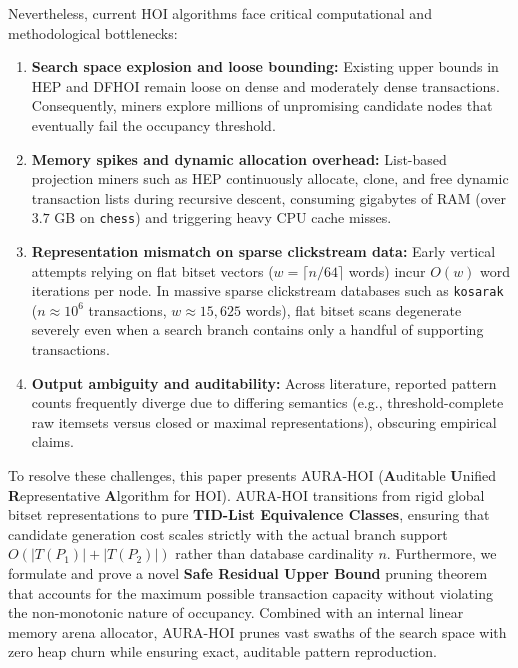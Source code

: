 \documentclass[runningheads,orivec]{llncs}
\newcommand{\AURA}{\textsc{AURA-HOI}}
\newcommand{\HEP}{\textsc{HEP}}
\newcommand{\DFHOI}{\textsc{DFHOI}}
\begin{document}
Nevertheless, current HOI algorithms face critical computational and methodological bottlenecks:
\begin{enumerate}
    \item \textbf{Search space explosion and loose bounding:} Existing upper bounds in \HEP{} and \DFHOI{} remain loose on dense and moderately dense transactions. Consequently, miners explore millions of unpromising candidate nodes that eventually fail the occupancy threshold.
    \item \textbf{Memory spikes and dynamic allocation overhead:} List-based projection miners such as \HEP{} continuously allocate, clone, and free dynamic transaction lists during recursive descent, consuming gigabytes of RAM (over $3.7$ GB on \texttt{chess}) and triggering heavy CPU cache misses.
    \item \textbf{Representation mismatch on sparse clickstream data:} Early vertical attempts relying on flat bitset vectors ($w = \lceil n/64 \rceil$ words) incur $O(w)$ word iterations per node. In massive sparse clickstream databases such as \texttt{kosarak} ($n \approx 10^6$ transactions, $w \approx 15{,}625$ words), flat bitset scans degenerate severely even when a search branch contains only a handful of supporting transactions.
    \item \textbf{Output ambiguity and auditability:} Across literature, reported pattern counts frequently diverge due to differing semantics (e.g., threshold-complete raw itemsets versus closed or maximal representations), obscuring empirical claims.
\end{enumerate}

To resolve these challenges, this paper presents \AURA{} (\textbf{A}uditable \textbf{U}nified \textbf{R}epresentative \textbf{A}lgorithm for HOI). \AURA{} transitions from rigid global bitset representations to pure \textbf{TID-List Equivalence Classes}, ensuring that candidate generation cost scales strictly with the actual branch support $O(|T(P_1)| + |T(P_2)|)$ rather than database cardinality $n$. Furthermore, we formulate and prove a novel \textbf{Safe Residual Upper Bound} pruning theorem that accounts for the maximum possible transaction capacity without violating the non-monotonic nature of occupancy. Combined with an internal linear memory arena allocator, \AURA{} prunes vast swaths of the search space with zero heap churn while ensuring exact, auditable pattern reproduction.
\end{document}
